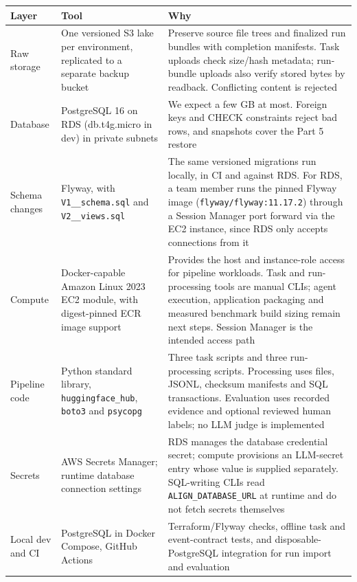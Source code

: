 \documentclass[11pt]{article}
\newcommand{\code}[1]{\texttt{#1}}
\begin{document}
{\small
\begin{tabularx}{\linewidth}{@{}L{2.2cm}L{4.4cm}Y@{}}
\toprule
\textbf{Layer} & \textbf{Tool} & \textbf{Why} \\
\midrule
Raw storage & One versioned S3 lake per environment, replicated to a separate backup bucket & Preserve source file trees and finalized run bundles with completion manifests. Task uploads check size/hash metadata; run-bundle uploads also verify stored bytes by readback. Conflicting content is rejected \\
Database & PostgreSQL 16 on RDS (db.t4g.micro in dev) in private subnets & We expect a few GB at most. Foreign keys and CHECK constraints reject bad rows, and snapshots cover the Part 5 restore \\
Schema changes & Flyway, with \code{V1\_\_schema.sql} and \code{V2\_\_views.sql} & The same versioned migrations run locally, in CI and against RDS. For RDS, a team member runs the pinned Flyway image (\code{flyway/flyway:11.17.2}) through a Session Manager port forward via the EC2 instance, since RDS only accepts connections from it \\
Compute & Docker-capable Amazon Linux 2023 EC2 module, with digest-pinned ECR image support & Provides the host and instance-role access for pipeline workloads. Task and run-processing tools are manual CLIs; agent execution, application packaging and measured benchmark build sizing remain next steps. Session Manager is the intended access path \\
Pipeline code & Python standard library, \code{huggingface\_hub}, \code{boto3} and \code{psycopg} & Three task scripts and three run-processing scripts. Processing uses files, JSONL, checksum manifests and SQL transactions. Evaluation uses recorded evidence and optional reviewed human labels; no LLM judge is implemented \\
Secrets & AWS Secrets Manager; runtime database connection settings & RDS manages the database credential secret; compute provisions an LLM-secret entry whose value is supplied separately. SQL-writing CLIs read \code{ALIGN\_DATABASE\_URL} at runtime and do not fetch secrets themselves \\
Local dev and CI & PostgreSQL in Docker Compose, GitHub Actions & Terraform/Flyway checks, offline task and event-contract tests, and disposable-PostgreSQL integration for run import and evaluation \\
\bottomrule
\end{tabularx}
}
\end{document}
